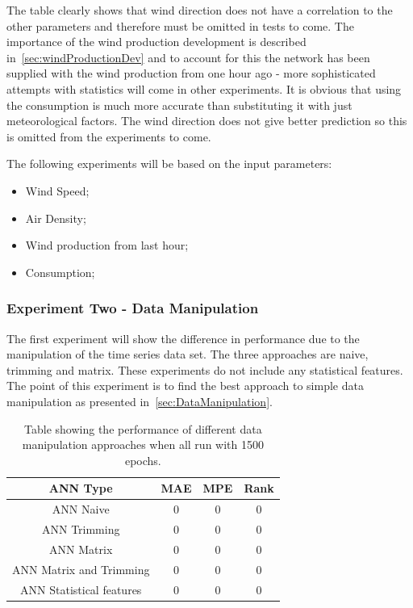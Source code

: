 The table clearly shows that wind direction does not have a correlation to the other parameters and therefore must be omitted in tests to come.
The importance of the wind production development is described in~\ref{sec:windProductionDev} and to account for this the network has been supplied with the wind production from one hour ago - more sophisticated attempts with statistics will come in other experiments.
It is obvious that using the consumption is much more accurate than substituting it with just meteorological factors. The wind direction does not give better prediction so this is omitted from the experiments to come.


The following experiments will be based on the input parameters:
\begin{itemize}
\item Wind Speed;
\item Air Density;
\item Wind production from last hour;
\item Consumption;
\end{itemize}


\subsubsection{Experiment Two - Data Manipulation}
The first experiment will show the difference in performance due to the manipulation of the time series data set. The three approaches are naive, trimming and matrix. These experiments do not include any statistical features. The point of this experiment is to find the best approach to simple data manipulation as presented in~\ref{sec:DataManipulation}.


\begin{table}[H]
\centering  %
\begin{tabular}{c c c c} %
ANN Type & MAE & MPE & Rank \\ [0.5ex] %
\hline                  %
ANN Naive & 0 & 0 & 0 \\ %
ANN Trimming & 0 & 0 & 0 \\
ANN Matrix  & 0 & 0 & 0\\
ANN Matrix and Trimming  & 0 & 0 & 0 \\ 
ANN Statistical features  & 0 & 0 & 0\\ [1ex] %
\hline %
\end{tabular}
\caption{Table showing the performance of different data manipulation approaches when all run with 1500 epochs.} %
\label{table:dataManipulationApproaches} %
\end{table}

